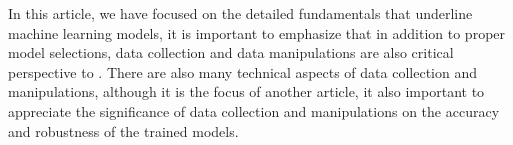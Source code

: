 
\par
In this article, we have focused on the detailed fundamentals that underline machine learning models, it is important to emphasize that in addition to proper model selections, data collection and data manipulations are also critical perspective to . There are also many technical aspects of data collection and manipulations, although it is the focus of another article, it also important to appreciate the significance of data collection and manipulations on the accuracy and robustness of the trained models.
\par 
